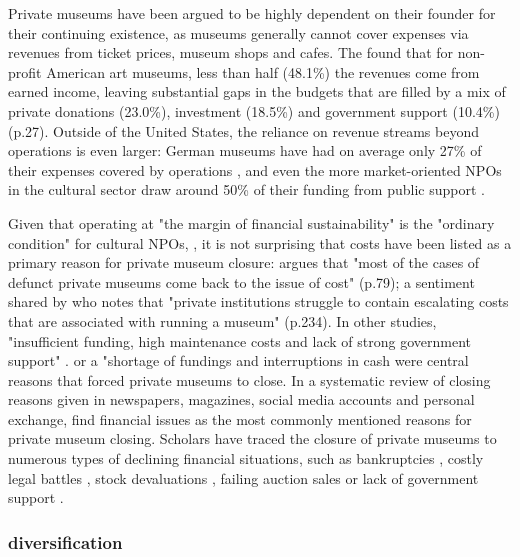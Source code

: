 \documentclass[12pt]{article}
\begin{document}
Private museums have been argued to be highly dependent on their founder for their continuing existence, as museums generally cannot cover expenses via revenues from ticket prices, museum shops and cafes.
The \textcite{IMLS_2008_funding} found that for non-profit American art museums, less than half (48.1\%) the revenues come from earned income, leaving substantial gaps in the budgets that are filled by a mix of private donations (23.0\%), investment (18.5\%) and government support (10.4\%) (p.27).
Outside of the United States, the reliance on revenue streams beyond operations is even larger:
German museums have had on average only 27\% of their expenses covered by operations \parencite[p.233]{Martin_1993_museen}, and even the more market-oriented NPOs in the cultural sector draw around 50\% of their funding from public support \parencite[p.82]{Zimmer_Priller_2007_gemeinnuetzig}.


Given that operating at "the margin of financial sustainability" is the "ordinary condition" for cultural NPOs, \cite[p.2]{Licci_BaraldiBonini_2024_sustainability}, it is not surprising that costs have been listed as a primary reason for private museum closure:
\textcite{Adam_2021_rise} argues that "most of the cases of defunct private museums come back to the issue of cost" (p.79); a sentiment shared by \textcite{Walker_2019_collector} who notes that "private institutions struggle to contain escalating costs that are associated with running a museum" (p.234).
In other studies, "insufficient funding, high maintenance costs and lack of strong government support" \parencite[p.7]{Zennaro_2017_shanghai}. or a "shortage of fundings and interruptions in cash \parencite[p.45]{Song_2008_private}  were central reasons that forced private museums to close.
In a systematic review of closing reasons given in newspapers, magazines, social media accounts and personal exchange, \textcite{Velthuis_Gera_2024_fragility} find financial issues as the most commonly mentioned reasons for private museum closing.
Scholars have traced the closure of private museums to numerous types of declining financial situations, such as bankruptcies \parencite{Velthuis_Gera_2024_fragility,Liu_2019_identities,DeNigris_2018_museums}, costly legal battles \parencite{Velthuis_Gera_2024_fragility}, stock devaluations \parencite{Walker_2019_collector}, failing auction sales \parencite{Bechtler_Imhof_2018_future} or lack of government support \parencite{Zennaro_2017_shanghai,Velthuis_Gera_2024_fragility}.
\subsubsection*{diversification}
\end{document}

